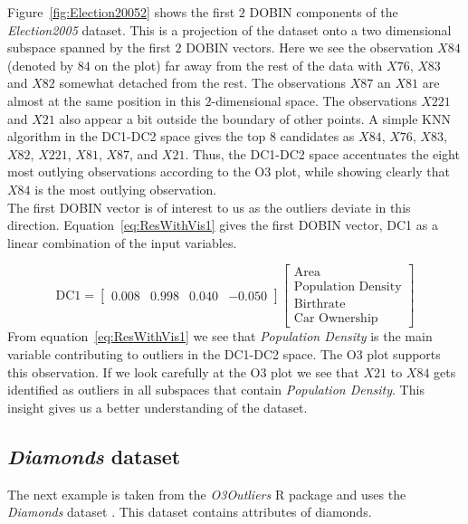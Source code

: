 \documentclass[a4paper,11pt]{article}
\begin{document}
Figure~\ref{fig:Election20052} shows the first $2$ DOBIN components of the \textit{Election2005} dataset. This is a projection of the dataset onto a two dimensional subspace spanned by the first $2$ DOBIN vectors. Here we see the observation $X84$ (denoted by $84$ on the plot) far away from the rest of the data with $X76$, $X83$ and $X82$ somewhat detached from the rest. The observations $X87$ an $X81$ are almost at the same position in this $2$-dimensional space. The observations $X221$ and $X21$ also appear a bit outside the boundary of  other points. A simple KNN algorithm in the DC1-DC2 space gives the top $8$ candidates as $X84$, $X76$,  $X83$, $X82$, $X221$, $X81$, $X87$, and  $X21$. Thus, the DC1-DC2 space accentuates the eight most outlying observations according to the O3 plot, while showing clearly that $X84$ is the most outlying observation. \\

The first DOBIN vector is of interest to us as the outliers deviate in this direction. Equation~\eqref{eq:ResWithVis1} gives the first DOBIN vector,   DC1 as a linear combination of the input variables. 

\begin{equation}\label{eq:ResWithVis1}
    \text{DC1} = \begin{bmatrix}
    0.008 & 0.998 & 0.040 & -0.050  
    \end{bmatrix}
    \begin{bmatrix}
    \text{Area} \\
    \text{Population Density} \\
    \text{Birthrate} \\
    \text{Car Ownership}
    \end{bmatrix}
\end{equation}
From equation~\eqref{eq:ResWithVis1} we see that \textit{Population Density} is the main variable contributing to outliers in the DC1-DC2 space. The O3 plot supports this observation. If we look carefully at the O3 plot we see that $X21$ to $X84$ gets identified as outliers in  all subspaces that contain \textit{Population Density}.  This insight gives us a better understanding of the dataset. 

\subsection{\textit{Diamonds} dataset}\label{sec:ResWithVis2}
The next example is taken from the \textit{O3Outliers} R package \citep{O3Rpack} and uses the \textit{Diamonds} dataset \citep{ggplot2}. This dataset contains attributes of diamonds.   \\ 
\end{document}
